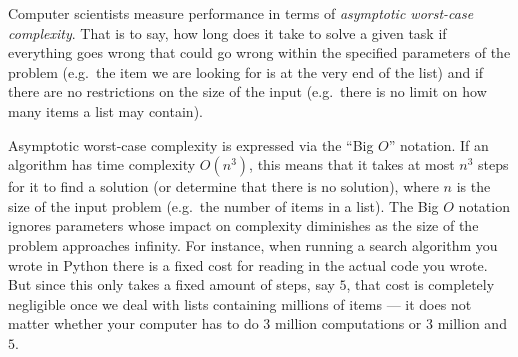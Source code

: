 \begin{techinfo}
    Computer scientists measure performance in terms of \emph{asymptotic worst-case complexity}.
    That is to say, how long does it take to solve a given task if everything goes wrong that could go wrong within the specified parameters of the problem (e.g.\ the item we are looking for is at the very end of the list) and if there are no restrictions on the size of the input (e.g.\ there is no limit on how many items a list may contain).

    Asymptotic worst-case complexity is expressed via the ``Big $O$'' notation.
    If an algorithm has time complexity $O(n^3)$, this means that it takes at most $n^3$ steps for it to find a solution (or determine that there is no solution), where $n$ is the size of the input problem (e.g.\ the number of items in a list).
    The Big $O$ notation ignores parameters whose impact on complexity diminishes as the size of the problem approaches infinity.
    For instance, when running a search algorithm you wrote in Python there is a fixed cost for reading in the actual code you wrote.
    But since this only takes a fixed amount of steps, say $5$, that cost is completely negligible once we deal with lists containing millions of items --- it does not matter whether your computer has to do 3 million computations or 3 million and $5$.


\end{techinfo}
